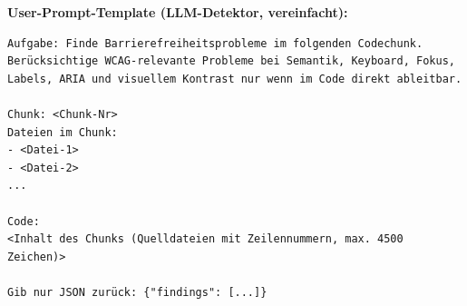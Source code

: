 \medskip
\noindent\textbf{User-Prompt-Template (LLM-Detektor, vereinfacht):}

\begin{lstlisting}[language={}, caption={User-Prompt-Template der LLM-Detektor-Phase; \texttt{<Chunk-Nr>}, \texttt{<Dateiliste>} und \texttt{<Code>} werden zur Laufzeit eingesetzt (aus \texttt{src/modules/llmDetector.ts})}, label={lst:detektoruserprompt}, basicstyle=\ttfamily\scriptsize, breaklines=true]
Aufgabe: Finde Barrierefreiheitsprobleme im folgenden Codechunk.
Berücksichtige WCAG-relevante Probleme bei Semantik, Keyboard, Fokus,
Labels, ARIA und visuellem Kontrast nur wenn im Code direkt ableitbar.

Chunk: <Chunk-Nr>
Dateien im Chunk:
- <Datei-1>
- <Datei-2>
...

Code:
<Inhalt des Chunks (Quelldateien mit Zeilennummern, max. 4500 Zeichen)>

Gib nur JSON zurück: {"findings": [...]}
\end{lstlisting}


\clearpage
{}\label{app:tokenbudget}

